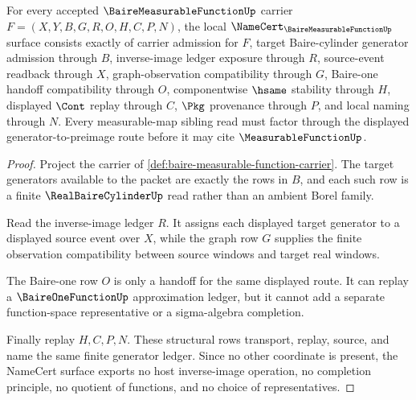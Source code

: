 \begin{theorem}
\label{thm:baire-measurable-function-namecert-obligations}
For every accepted $\BaireMeasurableFunctionUp$ carrier $F=(X,Y,B,G,R,O,H,C,P,N)$, the local $\NameCert_{\BaireMeasurableFunctionUp}$ surface consists exactly of carrier admission for $F$, target Baire-cylinder generator admission through $B$, inverse-image ledger exposure through $R$, source-event readback through $X$, graph-observation compatibility through $G$, Baire-one handoff compatibility through $O$, componentwise $\hsame$ stability through $H$, displayed $\Cont$ replay through $C$, $\Pkg$ provenance through $P$, and local naming through $N$. Every measurable-map sibling read must factor through the displayed generator-to-preimage route before it may cite $\MeasurableFunctionUp$.
\end{theorem}
\begin{proof}
Project the carrier of \autoref{def:baire-measurable-function-carrier}. The target generators available to the packet are exactly the rows in $B$, and each such row is a finite $\RealBaireCylinderUp$ read rather than an ambient Borel family.

Read the inverse-image ledger $R$. It assigns each displayed target generator to a displayed source event over $X$, while the graph row $G$ supplies the finite observation compatibility between source windows and target real windows.

The Baire-one row $O$ is only a handoff for the same displayed route. It can replay a $\BaireOneFunctionUp$ approximation ledger, but it cannot add a separate function-space representative or a sigma-algebra completion.

Finally replay $H,C,P,N$. These structural rows transport, replay, source, and name the same finite generator ledger. Since no other coordinate is present, the NameCert surface exports no host inverse-image operation, no completion principle, no quotient of functions, and no choice of representatives.
\end{proof}


